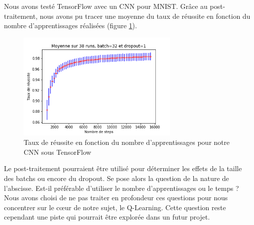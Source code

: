 Nous avons testé TensorFlow avec un CNN pour MNIST. Grâce au post-traitement, nous avons pu tracer une moyenne du taux de réussite en fonction du nombre d'apprentissages réalisées (figure \ref{fig:tb_post_traitement}).

\begin{figure}[h]
 \centering
 \includegraphics[width=0.7\textwidth]{img/tb_post_traitement.png}
 \caption{Taux de réussite en fonction du nombre d'apprentissages pour notre CNN sous TensorFlow}
 \label{fig:tb_post_traitement}
\end{figure}

Le post-traitement pourraient être utilisé pour déterminer les effets de la taille des batchs ou encore du dropout. Se pose alors la question de la nature de l’abscisse. Est-il préférable d'utiliser le nombre d'apprentissages ou le temps ?
Nous avons choisi de ne pas traiter en profondeur ces questions pour nous concentrer sur le c\oe ur de notre sujet, le Q-Learning. Cette question reste cependant une piste qui pourrait être explorée dans un futur projet.
